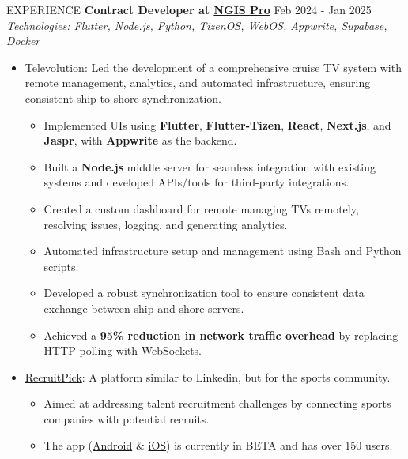 \documentclass{resume}
\begin{document}
\begin{rSection}{EXPERIENCE}
    \textbf{Contract Developer at \href{https://ngispro.com/}{NGIS Pro}} \hfill Feb 2024 - Jan 2025\\
    \textit{Technologies: Flutter, Node.js, Python, TizenOS, WebOS, Appwrite, Supabase, Docker}
    \begin{itemize}
        \itemsep -3pt {}
        \item \href{https://mytvpocroyal.com/web2}{Televolution}: Led the development of a comprehensive cruise TV system with remote management, analytics, and automated infrastructure, ensuring consistent ship-to-shore synchronization.
              \begin{itemize}
                  \itemsep -3pt {}
                  \item Implemented UIs using \textbf{Flutter}, \textbf{Flutter-Tizen}, \textbf{React}, \textbf{Next.js}, and \textbf{Jaspr}, with \textbf{Appwrite} as the backend.
                  \item Built a \textbf{Node.js} middle server for seamless integration with existing systems and developed APIs/tools for third-party integrations.
                  \item Created a custom dashboard for remote managing TVs remotely, resolving issues, logging, and generating analytics.
                  \item Automated infrastructure setup and management using Bash and Python scripts.
                  \item Developed a robust synchronization tool to ensure consistent data exchange between ship and shore servers.
                  \item Achieved a \textbf{95\% reduction in network traffic overhead} by replacing HTTP polling with WebSockets.
              \end{itemize}
        \item \href{https://recruitpick.com}{RecruitPick}: A platform similar to Linkedin, but for the sports community.
              \begin{itemize}
                  \item Aimed at addressing talent recruitment challenges by connecting sports companies with potential recruits.
                  \item The app (\href{https://play.google.com/store/apps/details?id=com.recruitpick.app.prod}{Android} \& \href{https://apps.apple.com/in/app/recruit-pick-inc/id6478814537}{iOS}) is currently in BETA and has over 150 users.
              \end{itemize}
    \end{itemize}


\end{rSection}
\end{document}
